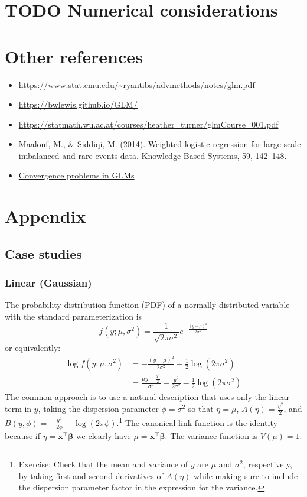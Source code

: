 \documentclass{article}
\newcommand{\bbeta}{\boldsymbol{\beta}}
\begin{document}
\section{TODO Numerical considerations}

\section{Other references}

\begin{itemize}
\item \url{https://www.stat.cmu.edu/~ryantibs/advmethods/notes/glm.pdf}
\item \url{https://bwlewis.github.io/GLM/}
\item \url{https://statmath.wu.ac.at/courses/heather_turner/glmCourse_001.pdf}
\item \href{https://doi.org/10.1016/j.knosys.2014.01.012}{Maalouf, M., \& Siddiqi, M. (2014). Weighted logistic regression for large-scale imbalanced and rare events data. Knowledge-Based Systems, 59, 142–148.}
\item \href{https://journal.r-project.org/archive/2011-2/RJournal_2011-2_Marschner.pdf}{Convergence problems in GLMs}
\end{itemize}

\section*{Appendix}

\subsection*{Case studies}

\subsubsection*{Linear (Gaussian)}

The probability distribution function (PDF) of a normally-distributed variable
with the standard parameterization is
\[ f(y; \mu, \sigma^2) = \frac{1}{\sqrt{2\pi\sigma^2}} e^{-\frac{(y - \mu)^2}{2\sigma^2}} \]
or equivalently:
\begin{align}
\log f(y; \mu, \sigma^2) &= -\frac{(y-\mu)^2}{2\sigma^2} - \frac{1}{2} \log (2\pi\sigma^2) \\\
&= \frac{\mu y - \frac{\mu^2}{2}}{\sigma^2} - \frac{y^2}{2\sigma^2} -
\frac{1}{2} \log (2\pi\sigma^2)
\end{align}
The common approach is to use a natural description that uses only the linear
term in \(y\), taking the dispersion parameter \(\phi = \sigma^2\) so that
\(\eta = \mu\), \(A(\eta) = \frac{\eta^2}{2}\), and \(B(y, \phi) =
-\frac{y^2}{2\phi} - \log(2\pi\phi) \).\footnote{
    Exercise: Check that the mean and variance of \(y\) are \(\mu\) and
    \(\sigma^2\), respectively, by taking first and second derivatives of
    \(A(\eta)\) while making sure to include the dispersion parameter factor
    in the expression for the variance.
}
The canonical link function is the identity because if \(\eta =
\mathbf{x}^\intercal\bbeta\) we clearly have \(\mu =
\mathbf{x}^\intercal \bbeta\).
The variance function is \(V(\mu) = 1\).
\end{document}
